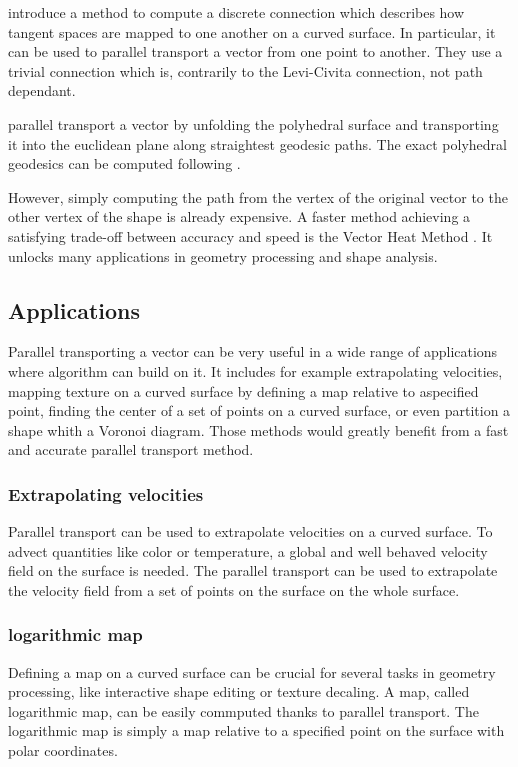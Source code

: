 \documentclass[sigconf, nonacm]{acmart}
\begin{document}
\cite{crane_trivial_2010} introduce a method to compute a discrete connection which describes how tangent spaces are mapped to one another on a curved surface. In particular, it can be used to parallel transport a vector from one point to another. They use a trivial connection which is, contrarily to the Levi-Civita connection, not path dependant.

\cite{polthier_straightest_2006} parallel transport a vector by unfolding the polyhedral surface and transporting it into the euclidean plane along straightest geodesic paths. The exact polyhedral geodesics can be computed following \cite{surazhsky_fast_nodate}.

However, simply computing the path from the vertex of the original vector to the other vertex of the shape is already expensive. A faster method achieving a satisfying trade-off between accuracy and speed is the Vector Heat Method \cite{Sharp:2019:VHM}. It unlocks many applications in geometry processing and shape analysis.


\subsection{Applications}
Parallel transporting a vector can be very useful in a wide range of applications where algorithm can build on it. It includes for example extrapolating velocities, mapping texture on a curved surface by defining a map relative to aspecified point, finding the center of a set of points on a curved surface, or even partition a shape whith a Voronoi diagram. Those methods would greatly benefit from a fast and accurate parallel transport method.

\subsubsection{Extrapolating velocities}
Parallel transport can be used to extrapolate velocities on a curved surface. To advect quantities like color or temperature, a global and well behaved velocity field on the surface is needed. The parallel transport can be used to extrapolate the velocity field from a set of points on the surface on the whole surface.

\subsubsection{logarithmic map}
Defining a map on a curved surface can be crucial for several tasks in geometry processing, like interactive shape editing or texture decaling. A map, called logarithmic map, can be easily commputed thanks to parallel transport. The logarithmic map is simply a map relative to a specified point on the surface with polar coordinates. 
\end{document}
